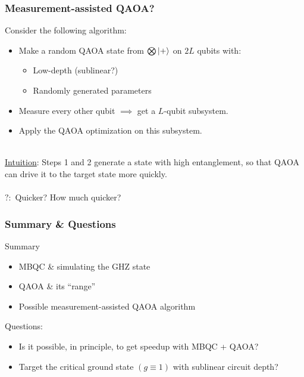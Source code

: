 \documentclass{beamer}
\theoremstyle{definition}
\begin{document}
\begin{frame}

\end{frame}






\begin{frame}
\frametitle{Measurement-assisted QAOA?}


Consider the following algorithm:
\begin{itemize}
	\item Make a random QAOA state from $\bigotimes \left\vert{+}\right\rangle$ on $2L$ qubits with:
	\begin{itemize}
		\item Low-depth (sublinear?)
		\item Randomly generated parameters
	\end{itemize}

	\item Measure every other qubit $\implies$ get a $L$-qubit subsystem.
	
	\item Apply the QAOA optimization on this subsystem. 
\end{itemize}
$\,$\\
\underline{Intuition}: Steps 1 and 2 generate a state with high entanglement, so that QAOA can drive it to the target state more quickly.\\
$\,$\\
$\boxed{?}:$ Quicker? How much quicker? 

\end{frame}






\begin{frame}
\frametitle{Summary \& Questions}

Summary
\begin{itemize}
	\item MBQC \& simulating the GHZ state
	\item QAOA \& its ``range''
	\item Possible measurement-assisted QAOA algorithm
	
	
\end{itemize}

Questions:

\begin{itemize}
	\item Is it possible, in principle, to get speedup with MBQC + QAOA?
	
	\item Target the critical ground state $(g\equiv 1)$ with sublinear circuit depth?
\end{itemize}

\end{frame}
\end{document}
